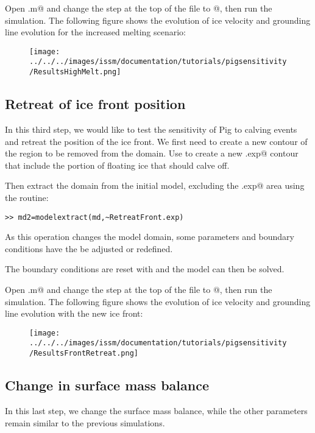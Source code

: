 Open \verb@runme.m@ and change the step at the top of the file to @, then run the simulation. The following figure shows the evolution of ice velocity and grounding line evolution for the increased melting scenario:
\begin{figure}[H]
	\begin{center}
		\texttt{[image: ../../../images/issm/documentation/tutorials/pigsensitivity/ResultsHighMelt.png]}
	\end{center}
\end{figure}
\subsection{Retreat of ice front position}%
In this third step, we would like to test the sensitivity of Pig to calving events and retreat the position of the ice front. We first need to create a new contour of the region to be removed from the domain. Use \verb@exptool@ to create a new \verb@RetreatFront.exp@ contour that include the portion of floating ice that should calve off.

Then extract the domain from the initial model, excluding the \verb@RetreatFront.exp@ area using the \verb@extrude@ routine:
\begin{verbatim}>> md2=modelextract(md,~RetreatFront.exp)\end{verbatim}

As this operation changes the model domain, some parameters and boundary conditions have the be adjusted or redefined.

The boundary conditions are reset with \verb@SetMarineIceSheetBC@ and the model can then be solved.

Open \verb@runme.m@ and change the step at the top of the file to @, then run the simulation. The following figure shows the evolution of ice velocity and grounding line evolution with the new ice front:
\begin{figure}[H]
	\begin{center}
		\texttt{[image: ../../../images/issm/documentation/tutorials/pigsensitivity/ResultsFrontRetreat.png]}
	\end{center}
\end{figure}
\subsection{Change in surface mass balance}%
In this last step, we change the surface mass balance, while the other parameters remain similar to the previous simulations.


